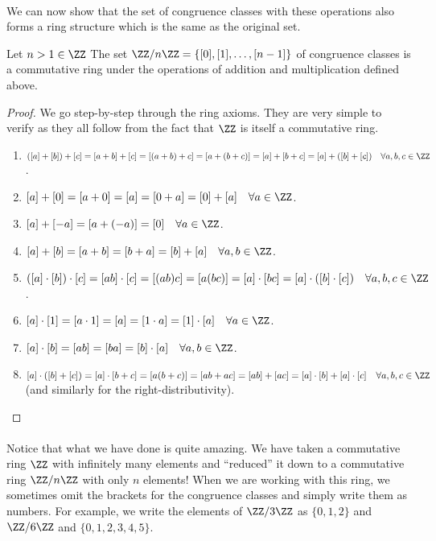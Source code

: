 \documentclass[../abstract_algebra.tex]{subfiles}
\begin{document}
        \paragraph{}
        We can now show that the set of congruence classes with these operations also forms a ring structure which is the same as the original set.
        \begin{theorem}
            Let $n>1\in\ZZ$ The set $\ZZ/n\ZZ=\{[0],[1],\dots,[n-1]\}$ of congruence classes is a commutative ring under the operations of addition and multiplication defined above.
        \end{theorem}
        \begin{proof}
            We go step-by-step through the ring axioms.
            They are very simple to verify as they all follow from the fact that $\ZZ$ is itself a commutative ring.
            \begin{enumerate}[label={\upshape(\roman*)}]
                \item $([a]+[b])+[c]=[a+b]+[c]=[(a+b)+c]=[a+(b+c)]=[a]+[b+c]=[a]+([b]+[c])\quad\forall a,b,c\in\ZZ$.
                \item $[a]+[0]=[a+0]=[a]=[0+a]=[0]+[a]\quad\forall a\in\ZZ$.
                \item $[a]+[-a]=[a+(-a)]=[0]\quad\forall a\in\ZZ$.
                \item $[a]+[b]=[a+b]=[b+a]=[b]+[a]\quad\forall a,b\in\ZZ$.
                \item $([a]\cdot[b])\cdot[c]=[ab]\cdot[c]=[(ab)c]=[a(bc)]=[a]\cdot[bc]=[a]\cdot([b]\cdot[c])\quad\forall a,b,c\in\ZZ$.
                \item $[a]\cdot[1]=[a\cdot 1]=[a]=[1\cdot a]=[1]\cdot[a]\quad\forall a\in\ZZ$.
                \item $[a]\cdot[b]=[ab]=[ba]=[b]\cdot[a]\quad\forall a,b\in\ZZ$.
                \item $[a]\cdot([b]+[c])=[a]\cdot[b+c]=[a(b+c)]=[ab+ac]=[ab]+[ac]=[a]\cdot[b]+[a]\cdot[c]\quad\forall a,b,c\in\ZZ$ (and similarly for the right-distributivity).
            \end{enumerate}
        \end{proof}

        \paragraph{}
        Notice that what we have done is quite amazing.
        We have taken a commutative ring $\ZZ$ with infinitely many elements and ``reduced'' it down to a commutative ring $\ZZ/n\ZZ$ with only $n$ elements!
        When we are working with this ring, we sometimes omit the brackets for the congruence classes and simply write them as numbers.
        For example, we write the elements of $\ZZ/3\ZZ$ as $\{0,1,2\}$ and $\ZZ/6\ZZ$ and $\{0,1,2,3,4,5\}$.
         
\end{document}
